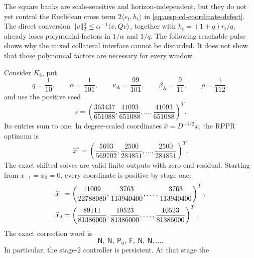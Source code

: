 The square banks are scale-sensitive and horizon-independent, but they do
not yet control the Euclidean cross term
$2\langle e_t,h_t\rangle$ in
\cref{eq:aesp-cd-coordinate-defect}.  The direct conversion
$\lVert v\rVert_2^2\leq\alpha^{-1}\langle v,Qv\rangle$, together with
$h_t=(1+q)r_t/q$, already loses polynomial factors in $1/\alpha$ and $1/q$.
The following reachable pulse shows why the mixed collateral interface
cannot be discarded.  It does not show that those polynomial factors are
necessary for every window.

\begin{proposition}
\label{prop:aesp-cd-k8-reachable-pulse}
Consider $K_8$, put
\begin{equation*}
 q=\frac1{10},\qquad
 \alpha=\frac1{101},\qquad
 \kappa_{\mathrm A}=\frac{99}{101},\qquad
 \beta_{\mathrm A}=\frac9{11},\qquad
 \rho=\frac1{112},
\end{equation*}
and use the positive seed
\begin{equation}
 s=\left(\frac{363437}{651088},
          \frac{41093}{651088},\ldots,
          \frac{41093}{651088}\right)^T.
 \label{eq:aesp-cd-k8-reachable-seed}
\end{equation}
Its entries sum to one.  In degree-scaled coordinates
$\widehat x=D^{-1/2}x$, the RPPR optimum is
\begin{equation}
 \widehat x^\star
 =\left(\frac{5693}{569702},
         \frac{2500}{284851},\ldots,
         \frac{2500}{284851}\right)^T.
 \label{eq:aesp-cd-k8-reachable-optimum}
\end{equation}
The exact shifted solves are valid finite outputs with zero end residual.
Starting from $x_{-1}=x_0=0$, every coordinate is positive by stage one:
\begin{align}
 \widehat x_1
 &=\left(\frac{11009}{22788080},
          \frac{3763}{113940400},\ldots,
          \frac{3763}{113940400}\right)^T,
 \notag\\
 \widehat x_2
 &=\left(\frac{89111}{81386000},
          \frac{10523}{81386000},\ldots,
          \frac{10523}{81386000}\right)^T.
 \label{eq:aesp-cd-k8-reachable-first-points}
\end{align}
The exact correction word is
\begin{equation}
 \mathsf N,\ \mathsf N,\ \mathsf P_0,\ \mathsf F,
 \ \mathsf N,\ \mathsf N,\ldots.
 \label{eq:aesp-cd-k8-reachable-word}
\end{equation}
In particular, the stage-$2$ controller is persistent.  At that stage the

\end{proposition}
